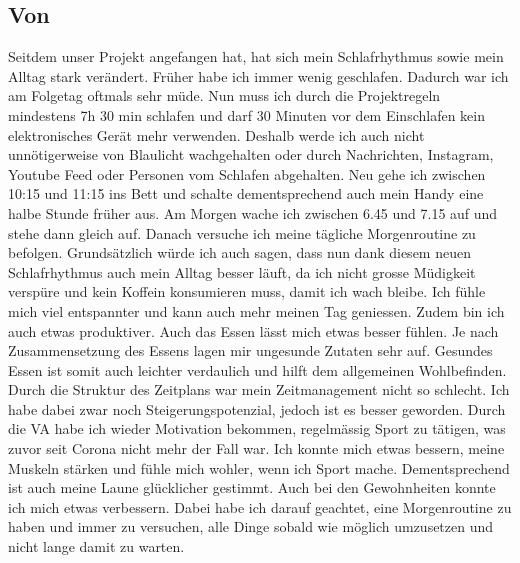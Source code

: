 \subsection{Von \bastian}
\authortoc{\bastian}{\subsectionident}
Seitdem unser Projekt angefangen hat, hat sich mein Schlafrhythmus sowie mein Alltag stark verändert. Früher habe ich immer wenig geschlafen. Dadurch war ich am Folgetag oftmals sehr müde. Nun muss ich durch die Projektregeln mindestens 7h 30 min schlafen und darf 30 Minuten vor dem Einschlafen kein elektronisches Gerät mehr verwenden. Deshalb werde ich auch nicht unnötigerweise von Blaulicht wachgehalten oder durch Nachrichten, Instagram, Youtube Feed oder Personen vom Schlafen abgehalten. Neu gehe ich zwischen 10:15 und 11:15 ins Bett und schalte dementsprechend auch mein Handy eine halbe Stunde früher aus. Am Morgen wache ich zwischen 6.45 und 7.15 auf und stehe dann gleich auf. Danach versuche ich meine tägliche Morgenroutine zu befolgen. Grundsätzlich würde ich auch sagen, dass nun dank diesem neuen Schlafrhythmus auch mein Alltag besser läuft, da ich nicht grosse Müdigkeit verspüre und kein Koffein konsumieren muss, damit ich wach bleibe. Ich fühle mich viel entspannter und kann auch mehr meinen Tag geniessen. Zudem bin ich auch etwas produktiver. Auch das Essen lässt mich etwas besser fühlen. Je nach Zusammensetzung des Essens lagen mir ungesunde Zutaten sehr auf. Gesundes Essen ist somit auch leichter verdaulich und hilft dem allgemeinen Wohlbefinden. Durch die Struktur des Zeitplans war mein Zeitmanagement nicht so schlecht. Ich habe dabei zwar noch Steigerungspotenzial, jedoch ist es besser geworden. Durch die VA habe ich wieder Motivation bekommen, regelmässig Sport zu tätigen, was zuvor seit Corona nicht mehr der Fall war. Ich konnte mich etwas bessern, meine Muskeln stärken und fühle mich wohler, wenn ich Sport mache. Dementsprechend ist auch meine Laune glücklicher gestimmt. Auch bei den Gewohnheiten konnte ich mich etwas verbessern. Dabei habe ich darauf geachtet, eine Morgenroutine zu haben und immer zu versuchen, alle Dinge sobald wie möglich umzusetzen und nicht lange damit zu warten.
